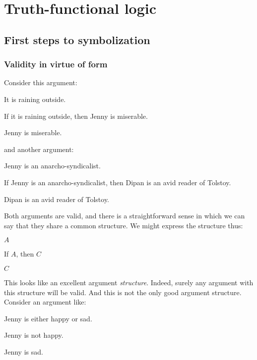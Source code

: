\part{Truth-functional logic}
\label{ch.TFL}

\chapter{First steps to symbolization}

\section{Validity in virtue of form}\label{s:ValidityInVirtueOfForm}
Consider this argument:
	\begin{earg}
		\item[] It is raining outside.
		\item[] If it is raining outside, then Jenny is miserable.
		\item[\texttherefore] Jenny is miserable.
	\end{earg}
and another argument:
	\begin{earg}
		\item[] Jenny is an anarcho-syndicalist.
		\item[] If Jenny is an anarcho-syndicalist, then Dipan is an avid reader of Tolstoy.
		\item[\texttherefore] Dipan is an avid reader of Tolstoy.
	\end{earg}
Both arguments are valid, and there is a straightforward sense in which we can say that they share a common structure. We might express the structure thus:
	\begin{earg}
		\item[] $A$
		\item[] If $A$, then $C$
		\item[\texttherefore] $C$
	\end{earg}
This looks like an excellent argument \emph{structure}. Indeed, surely any argument with this structure will be valid. And this is not the only good argument structure. Consider an argument like:
	\begin{earg}
		\item[] Jenny is either happy or sad.
		\item[] Jenny is not happy.
		\item[\texttherefore] Jenny is sad.
	\end{earg}
